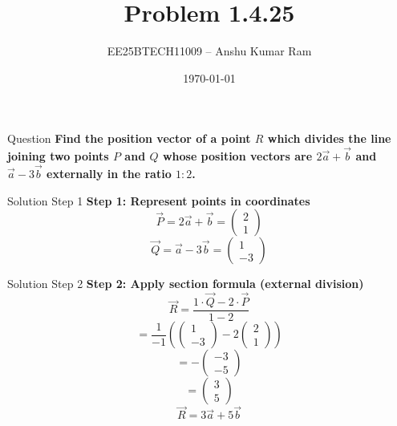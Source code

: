 \documentclass{beamer}
\title{Problem 1.4.25}
\author{EE25BTECH11009 – Anshu Kumar Ram}
\date{\today}
\newcommand{\brak}[1]{\begin{pmatrix}#1\end{pmatrix}}
\begin{document}
\begin{frame}
    \titlepage
\end{frame}

\begin{frame}{Question}
\textbf{Find the position vector of a point $R$ which divides the line joining two points $P$ and $Q$ whose position vectors are $2\vec{a} + \vec{b}$ and $\vec{a} - 3\vec{b}$ externally in the ratio $1:2$.}
\end{frame}

\begin{frame}{Solution Step 1}
\textbf{Step 1: Represent points in coordinates}  
\begin{equation}
\vec{P} = 2\vec{a} + \vec{b} = \brak{2\\1}
\end{equation}
\begin{equation}
\vec{Q} = \vec{a} - 3\vec{b} = \brak{1\\-3}
\end{equation}
\end{frame}

\begin{frame}{Solution Step 2}
\textbf{Step 2: Apply section formula (external division)}
\begin{equation}
\vec{R} = \frac{1 \cdot \vec{Q} - 2 \cdot \vec{P}}{1 - 2}
\end{equation}
\begin{equation}
= \frac{1}{-1}\left(\brak{1\\-3} - 2\brak{2\\1}\right)
\end{equation}
\begin{equation}
= -\brak{-3\\-5}
\end{equation}
\begin{equation}
= \brak{3\\5}
\end{equation}
\begin{equation}
\vec{R} = 3\vec{a} + 5\vec{b}
\end{equation}
\end{frame}
\end{document}

